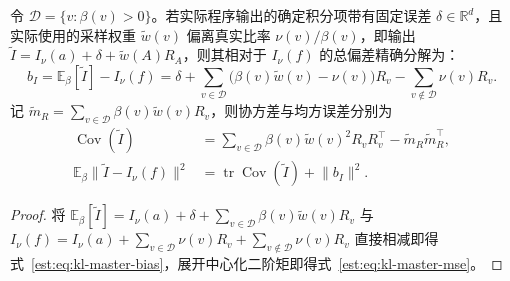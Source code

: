 \documentclass[lang=cn,scheme=chinese,openany]{elegantbook}
\newcommand{\E}{\mathbb E}
\newcommand{\R}{\mathbb R}
\begin{document}
\begin{theorem}
\label{est:thm:kl-master-bias}
令 $\mathcal D=\{v:\beta(v)>0\}$。若实际程序输出的确定积分项带有固定误差 $\delta\in\R^d$，且实际使用的采样权重 $\widetilde w(v)$ 偏离真实比率 $\nu(v)/\beta(v)$，即输出 $\widetilde I=I_\nu(a)+\delta+\widetilde w(A)R_A$，则其相对于 $I_\nu(f)$ 的总偏差精确分解为：
\begin{equation}
 b_I=\E_\beta[\widetilde I]-I_\nu(f)=\delta
 +\sum_{v\in\mathcal D}\bigl(\beta(v)\widetilde w(v)-\nu(v)\bigr)R_v
 -\sum_{v\notin\mathcal D}\nu(v)R_v.
 \label{est:eq:kl-master-bias}
\end{equation}
记 $\widetilde m_R=\sum_{v\in\mathcal D}\beta(v)\widetilde w(v)R_v$，则协方差与均方误差分别为
\begin{align}
 \operatorname{Cov}(\widetilde I)
 &=\sum_{v\in\mathcal D}\beta(v)\widetilde w(v)^2 R_v R_v^\top
 -\widetilde m_R\widetilde m_R^\top,\\
 \E_\beta\lVert\widetilde I-I_\nu(f)\rVert^2
 &=\operatorname{tr}\operatorname{Cov}(\widetilde I)+\lVert b_I\rVert^2.
 \label{est:eq:kl-master-mse}
\end{align}
\end{theorem}
\begin{proof}
将 $\E_\beta[\widetilde I]=I_\nu(a)+\delta+\sum_{v\in\mathcal D}\beta(v)\widetilde w(v)R_v$ 与 $I_\nu(f)=I_\nu(a)+\sum_{v\in\mathcal D}\nu(v)R_v+\sum_{v\notin\mathcal D}\nu(v)R_v$ 直接相减即得式~\eqref{est:eq:kl-master-bias}，展开中心化二阶矩即得式~\eqref{est:eq:kl-master-mse}。
\end{proof}
\end{document}
